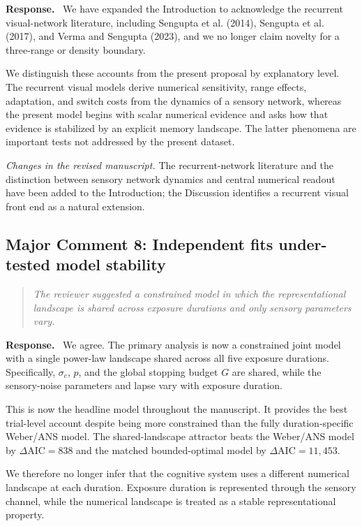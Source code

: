 \documentclass[11pt]{article}
\newenvironment{reviewercomment}{\begin{quote}\color{reviewgray}\itshape}{\end{quote}}
\newenvironment{authorresponse}{\par\noindent\textbf{\color{responseblue}Response.}\ }{\par}
\newcommand{\change}[1]{\par\noindent\textit{Changes in the revised manuscript.} #1\par}
\begin{document}
\begin{authorresponse}
We have expanded the Introduction to acknowledge the recurrent visual-network literature, including Sengupta et al. (2014), Sengupta et al. (2017), and Verma and Sengupta (2023), and we no longer claim novelty for a three-range or density boundary.

We distinguish these accounts from the present proposal by explanatory level. The recurrent visual models derive numerical sensitivity, range effects, adaptation, and switch costs from the dynamics of a sensory network, whereas the present model begins with scalar numerical evidence and asks how that evidence is stabilized by an explicit memory landscape. The latter phenomena are important tests not addressed by the present dataset.
\end{authorresponse}

\change{The recurrent-network literature and the distinction between sensory network dynamics and central numerical readout have been added to the Introduction; the Discussion identifies a recurrent visual front end as a natural extension.}

\subsection*{Major Comment 8: Independent fits under-tested model stability}

\begin{reviewercomment}
The reviewer suggested a constrained model in which the representational landscape is shared across exposure durations and only sensory parameters vary.
\end{reviewercomment}

\begin{authorresponse}
We agree. The primary analysis is now a constrained joint model with a single power-law landscape shared across all five exposure durations. Specifically, $\sigma_c$, $p$, and the global stopping budget $G$ are shared, while the sensory-noise parameters and lapse vary with exposure duration.

This is now the headline model throughout the manuscript. It provides the best trial-level account despite being more constrained than the fully duration-specific Weber/ANS model. The shared-landscape attractor beats the Weber/ANS model by $\Delta\mathrm{AIC}=838$ and the matched bounded-optimal model by $\Delta\mathrm{AIC}=11{,}453$.

We therefore no longer infer that the cognitive system uses a different numerical landscape at each duration. Exposure duration is represented through the sensory channel, while the numerical landscape is treated as a stable representational property.
\end{authorresponse}
\end{document}

